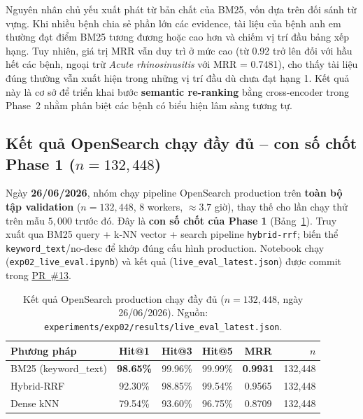 Nguyên nhân chủ yếu xuất phát từ bản chất của BM25, vốn dựa trên đối sánh từ vựng. Khi nhiều bệnh chia sẻ phần lớn các evidence, tài liệu của bệnh anh em thường đạt điểm BM25 tương đương hoặc cao hơn và chiếm vị trí đầu bảng xếp hạng. Tuy nhiên, giá trị MRR vẫn duy trì ở mức cao (từ 0.92 trở lên đối với hầu hết các bệnh, ngoại trừ \textit{Acute rhinosinusitis} với MRR = 0.7481), cho thấy tài liệu đúng thường vẫn xuất hiện trong những vị trí đầu dù chưa đạt hạng 1. Kết quả này là cơ sở để triển khai bước \textbf{semantic re-ranking} bằng cross-encoder trong Phase~2 nhằm phân biệt các bệnh có biểu hiện lâm sàng tương tự.

\subsection{Kết quả OpenSearch chạy đầy đủ -- con số chốt Phase 1 ($n=132{,}448$)}
Ngày \textbf{26/06/2026}, nhóm chạy pipeline OpenSearch production trên \textbf{toàn bộ tập validation} ($n=132{,}448$, 8 workers, $\approx 3.7$ giờ), thay thế cho lần chạy thử trên mẫu $5{,}000$ trước đó. Đây là \textbf{con số chốt của Phase 1} (Bảng~\ref{tab:livefull}). Truy xuất qua BM25 query + k-NN vector + search pipeline \texttt{hybrid-rrf}; biến thể \texttt{keyword\_text}/no-desc để khớp đúng cấu hình production. Notebook chạy (\texttt{exp02\_live\_eval.ipynb}) và kết quả (\texttt{live\_eval\_latest.json}) được commit trong \href{https://github.com/AIVIETNAM-AIO-Lucyna/Disease-Diagnosis-RAG-System/pull/13}{PR~\#13}.

\begin{table}[H]
  \centering
  \small
  \caption{Kết quả OpenSearch production chạy đầy đủ ($n=132{,}448$, ngày 26/06/2026). Nguồn: \texttt{experiments/exp02/results/live\_eval\_latest.json}.}
  \label{tab:livefull}
  \begin{tabular}{lccccr}
    \toprule
    \textbf{Phương pháp} & \textbf{Hit@1}   & \textbf{Hit@3} & \textbf{Hit@5} & \textbf{MRR}    & \textbf{$n$} \\
    \midrule
    BM25 (keyword\_text) & \textbf{98.65\%} & 99.96\%        & 99.99\%        & \textbf{0.9931} & 132{,}448    \\
    Hybrid-RRF           & 92.30\%          & 98.85\%        & 99.54\%        & 0.9565          & 132{,}448    \\
    Dense kNN            & 79.54\%          & 93.60\%        & 96.75\%        & 0.8709          & 132{,}448    \\
    \bottomrule
  \end{tabular}
\end{table}

